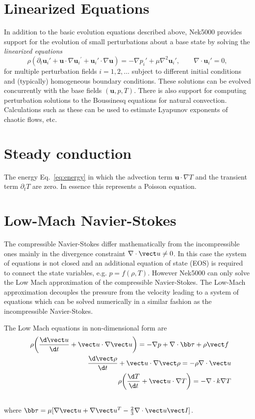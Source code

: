 \section{Linearized Equations}
In addition to the basic evolution equations described above, Nek5000
provides support for the evolution of small perturbations about
a base state by solving the {\em linearized equations}
\begin{equation} \label{eq:pertu}
  \rho(\partial_{t} {\mathbf u_i}' + \mathbf u \cdot \nabla {\mathbf u_i}^{'} + \mathbf u_i' \cdot \nabla \mathbf u) =
   - \nabla p_i' + \mu \nabla^2 \mathbf u_i', \qquad \nabla \cdot \mathbf u_i' = 0,
\end{equation}
for multiple perturbation fields \(i=1,2,\dots\) subject to different initial
conditions and (typically) homogeneous boundary conditions.  
These solutions can be evolved concurrently with the base fields \((\mathbf u,p,T)\).
There is also
support for computing perturbation solutions to the Boussinesq equations for
natural convection.  Calculations such as these can be used to estimate Lyapunov exponents of chaotic flows, etc.



\section{Steady conduction}    
The energy Eq.~\ref{eq:energy} in which the advection term \(\mathbf u \cdot \nabla T\)
    and the transient term \(\partial_{t} T\) are zero. In essence this represents a Poisson equation.
    

\section{Low-Mach Navier-Stokes}\label{sec:lowma}
The compressible Navier-Stokes differ mathematically from the incompressible ones mainly in the divergence constraint \(\nabla \cdot \vect u\neq 0\). In this case the system of equations is not closed and an additional equation of state (EOS) is required to connect the state variables, e.g. \(p=f(\rho,T)\). However Nek5000 can only solve the Low Mach approximation of the compressible Navier-Stokes. The Low-Mach approximation decouples the pressure from the velocity leading to a system of equations which can be solved numerically in a similar fashion as the incompressible Navier-Stokes.

The Low Mach equations in non-dimensional form are 
\begin{eqnarray}
&&\rho\bigg(\frac{\d \vect u}{\d t}+ \vect u\cdot\nabla\vect u\bigg)=-\nabla p+\nabla \cdot\bb\tau+\rho\vect f\ \\ \nonumber
&&\frac{\d \vect \rho}{\d t}+ \vect u\cdot\nabla\vect \rho=-\rho\nabla \cdot \vect u\\ \nonumber
&&\rho\bigg(\frac{\d T}{\d t}+ \vect u\cdot\nabla T\bigg)=-\nabla \cdot k \nabla T\\ \nonumber
\end{eqnarray}
where \(\bb\tau=\mu[\nabla \vect u+\nabla \vect u^{T}-\frac{2}{3}\nabla \cdot \vect u \vect I]\).


